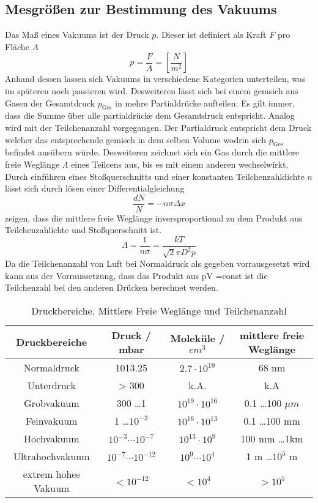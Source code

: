 \subsection{Mesgrößen zur Bestimmung des Vakuums}
Das Maß eines Vakuums ist der Druck $p$. Dieser ist definiert als Kraft $F$ pro Fläche $A$
\begin{equation}
  p = \frac{F}{A} = \left[ \frac{N}{m^2} \right]
  \label{eqn:druck}
\end{equation}
Anhand dessen lassen sich Vakuums in verschiedene Kategorien unterteilen, was im späteren noch passieren wird. Desweiteren lässt sich bei einem gemsich aus Gasen der Gesamtdruck $p_\text{Ges}$ in mehre Partialdrücke aufteilen. Es gilt immer, dass die Summe über alle partialdrücke dem Gesamtdruck entspricht. Analog wird mit der Teilchenanzahl vorgegangen. Der Partialdruck entspricht dem Druck welcher das entsprechende gemisch in dem selben Volume wodrin sich $p_\text{Ges}$ befindet ausübern würde. \newline
Desweiteren zeichnet sich ein Gas durch die mittlere freie Weglänge $\Lambda$ eines Teilcens aus, bis es mit einem anderen wechselwirkt. Durch einführen eines Stoßquerschnitts und einer konstanten Teilchenzahldichte $n$ lässt sich durch lösen einer Differentialgleichung 
\begin{equation}
  \frac{dN}{N} = -n \sigma \Delta x
  \label{eqn:mfWDGL}
\end{equation}
zeigen, dass die mittlere freie Weglänge  inversproportional zu dem Produkt aus Teilchenzahlichte und Stoßquerschnitt ist.
\begin{equation}
  \Lambda = \frac{1}{n \sigma}= \frac{k T}{\sqrt{2} \pi D^2 p}
  \label{eqn:mfW}
\end{equation}
Da die Teilchenanzahl von Luft bei Normaldruck als gegeben vorrausgesetzt wird kann aus der Vorraussetzung, dass das Produkt aus pV =const ist die Teilchenzahl bei den anderen Drücken berechnet werden. 
\begin{table}
  \centering
  \caption{Druckbereiche, Mittlere Freie Weglänge und Teilchenanzahl}
  \begin{tabular}{c|c c c}
  	\toprule
	Druckbereiche & Druck / mbar & Moleküle / $cm^3$ & mittlere freie Weglänge \\
	\midrule
	Normaldruck	& 1013.25			& $2.7 \cdot 10^{19}$ &	68 nm \\
	Unterdruck	& > 300				& k.A. & k.A \\
	Grobvakuum	& 300 \ldots 1 			&$10^{19} \cdot 10^{16}$&0.1 \ldots 100 $\mu m$ \\
	Feinvakuum	& 1 \ldots $10^{-3}$		& $10^{16} \cdot 10^{13}$ & 0.1 \ldots 100 mm \\
	Hochvakuum	& $10^{-3} \cdots 10^{-7}$	& $10^{13} \cdot 10^{9}$ & 100 mm \ldots 1km \\
	Ultrahochvakuum	& $10^{-7} \cdots 10^{-12}$	& $10^9 \cdots 10^4$ & 1 m \ldots $10^5$ m \\
	extrem hohes Vakuum & $< 10^{-12}$		& $<10^4$ & $> 10^5$ \\
	\bottomrule
  \end{tabular}
  \label{tab:ueberblick}
\end{table}


